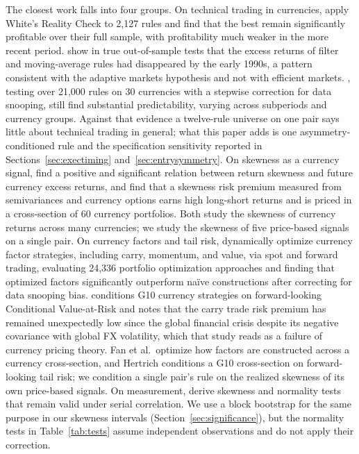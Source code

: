 \documentclass[11pt]{article}
\begin{document}
The closest work falls into four groups. On technical trading in currencies, \citet{qi2006technical} apply White's Reality Check to 2,127 rules and find that the best remain significantly profitable over their full sample, with profitability much weaker in the more recent period. \citet{neely2009adaptive} show in true out-of-sample tests that the excess returns of filter and moving-average rules had disappeared by the early 1990s, a pattern consistent with the adaptive markets hypothesis and not with efficient markets. \citet{hsu2016technical}, testing over 21,000 rules on 30 currencies with a stepwise correction for data snooping, still find substantial predictability, varying across subperiods and currency groups. Against that evidence a twelve-rule universe on one pair says little about technical trading in general; what this paper adds is one asymmetry-conditioned rule and the specification sensitivity reported in Sections~\ref{sec:exectiming} and~\ref{sec:entrysymmetry}. On skewness as a currency signal, \citet{jiang2019skewness} find a positive and significant relation between return skewness and future currency excess returns, and \citet{li2026skewness} find that a skewness risk premium measured from semivariances and currency options earns high long-short returns and is priced in a cross-section of 60 currency portfolios. Both study the skewness of currency returns across many currencies; we study the skewness of five price-based signals on a single pair. On currency factors and tail risk, \citet{fan2025optimizing} dynamically optimize currency factor strategies, including carry, momentum, and value, via spot and forward trading, evaluating 24,336 portfolio optimization approaches and finding that optimized factors significantly outperform na\"{i}ve constructions after correcting for data snooping bias. \citet{hertrich2025cvar} conditions G10 currency strategies on forward-looking Conditional Value-at-Risk and notes that the carry trade risk premium has remained unexpectedly low since the global financial crisis despite its negative covariance with global FX volatility, which that study reads as a failure of currency pricing theory. Fan et al.\ optimize how factors are constructed across a currency cross-section, and Hertrich conditions a G10 cross-section on forward-looking tail risk; we condition a single pair's rule on the realized skewness of its own price-based signals. On measurement, \citet{bai2005tests} derive skewness and normality tests that remain valid under serial correlation. We use a block bootstrap for the same purpose in our skewness intervals (Section~\ref{sec:significance}), but the normality tests in Table~\ref{tab:tests} assume independent observations and do not apply their correction.
\end{document}
